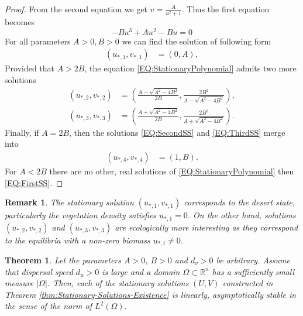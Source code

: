\documentclass[12pt, a4paper]{article}
\theoremstyle{break}
\newtheorem{thm}{Theorem}[section]
\theoremstyle{break}
\theoremstyle{break}
\theoremstyle{break}
\newtheorem{rem}{Remark}[section]
\theoremstyle{break}
\theoremstyle{break}
\theoremstyle{break}
\begin{document}
\begin{proof}
    From the second equation we get $v = \frac{A}{u^2 + 1}$. Thus the first equation becomes
    \begin{equation}
        \label{EQ:StationaryPolynomial}
        -B u^3 + A u^2 - B u = 0
    \end{equation}
    For all parameters $A > 0, B > 0$ we can find the solution of following form
    \begin{align}
        \label{EQ:FirstSS}
        \left(u_{*,1}, v_{*,1}\right) &= \left(0, A\right),
    \end{align}
    Provided that $A > 2B$, the equation \eqref{EQ:StationaryPolynomial} admits two more solutions
    \begin{align}
        \left(u_{*,2}, v_{*,2}\right) &= \left(\frac{A - \sqrt{A^2 - 4B^2}}{2B}, \frac{2 B^2}{A - \sqrt{A^2 - 4B^2}}\right), \label{EQ:SecondSS}\\
        \left(u_{*,3}, v_{*,3}\right) &= \left(\frac{A + \sqrt{A^2 - 4B^2}}{2B}, \frac{2 B^2}{A + \sqrt{A^2 - 4B^2}}\right) \label{EQ:ThirdSS}.
    \end{align}
    Finally, if $A = 2B$, then the solutions \eqref{EQ:SecondSS} and \eqref{EQ:ThirdSS} merge into 
    \begin{align}
        \label{EQ:FourthSS}
        \left( u_{*,4}, v_{*,4} \right) &= \left(1, B\right).
    \end{align}
    For $A < 2B$ there are no other, real solutions of \eqref{EQ:StationaryPolynomial} then \eqref{EQ:FirstSS}.
\end{proof}

\begin{rem}
    \label{rem:classification_steady_states}
    The stationary solution $(u_{*,1},v_{*,1})$ corresponds to the desert state, particularly the vegetation density satisfies $u_{*,1} = 0$. On the other hand, solutions $(u_{*,2},v_{*,2})$ and $(u_{*,3},v_{*,3})$ are ecologically more interesting as they correspond to the equilibria with a non-zero biomass $u_{*,i} \neq 0$.
\end{rem}

\begin{thm}
    \label{thm:Stationary-Solutions-Stability}
    Let the parameters $A > 0$, $B > 0$ and $d_v > 0$ be arbitrary. Assume that dispersal speed $d_u > 0$ is large and a domain $\Omega \subset \mathbb{R}^n$ has a sufficiently small measure $|\Omega|$. Then, each of the stationary solutions $(U, V)$ constructed in Theorem \ref{thm:Stationary-Solutions-Existence} is linearly, asymptotically stable in the sense of the norm of $L^2(\Omega)$.
\end{thm}
\end{document}
